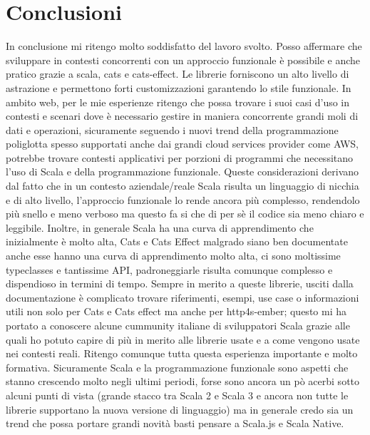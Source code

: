 \chapter{Conclusioni}

In conclusione mi ritengo molto soddisfatto del lavoro svolto. Posso affermare che sviluppare in contesti concorrenti con un approccio funzionale è possibile e anche pratico grazie a scala, cats e cats-effect. Le librerie forniscono un alto livello di astrazione e permettono forti customizzazioni garantendo lo stile funzionale. In ambito web, per le mie esperienze ritengo che possa trovare i suoi casi d'uso in contesti e scenari dove è necessario gestire in maniera concorrente grandi moli di dati e operazioni, sicuramente seguendo i nuovi trend della programmazione poliglotta spesso supportati anche dai grandi cloud services provider come AWS, potrebbe trovare contesti applicativi per porzioni di programmi che necessitano l'uso di Scala e della programmazione funzionale. Queste considerazioni derivano dal fatto che in un contesto aziendale/reale Scala risulta un linguaggio di nicchia e di alto livello, l'approccio funzionale lo rende ancora più complesso, rendendolo più snello e meno verboso ma questo fa si che di per sè il codice sia meno chiaro e leggibile. Inoltre, in generale Scala ha una curva di apprendimento che inizialmente è molto alta, Cats e Cats Effect malgrado siano ben documentate anche esse hanno una curva di apprendimento molto alta, ci sono moltissime typeclasses e tantissime API, padroneggiarle risulta comunque complesso e dispendioso in termini di tempo. Sempre in merito a queste librerie, usciti dalla documentazione è complicato trovare riferimenti, esempi, use case o informazioni utili non solo per Cats e Cats effect ma anche per http4s-ember; questo mi ha portato a conoscere alcune cummunity italiane di sviluppatori Scala grazie alle quali ho potuto capire di più in merito alle librerie usate e a come vengono usate nei contesti reali. Ritengo comunque tutta questa esperienza importante e molto formativa. Sicuramente Scala e la programmazione funzionale sono aspetti che stanno crescendo molto negli ultimi periodi, forse sono ancora un pò acerbi sotto alcuni punti di vista (grande stacco tra Scala 2 e Scala 3 e ancora non tutte le librerie supportano la nuova versione di linguaggio) ma in generale credo sia un trend che possa portare grandi novità basti pensare a Scala.js e Scala Native.